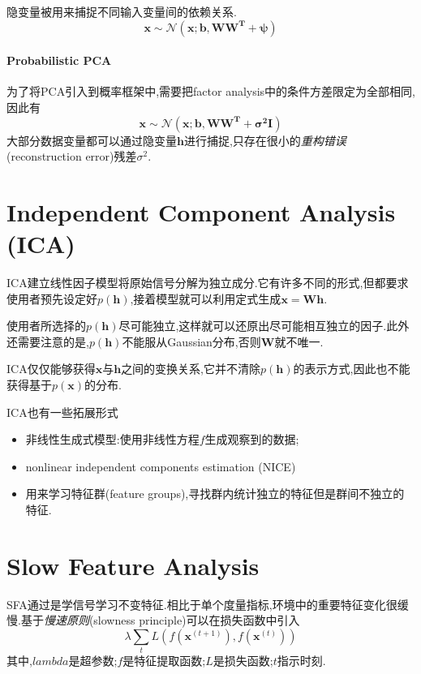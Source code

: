 隐变量被用来捕捉不同输入变量间的依赖关系.
\begin{equation}
\mathbf x\sim\mathcal N(\mathbf{x;b,WW^T+\psi})
\end{equation}

\paragraph{Probabilistic PCA}

为了将PCA引入到概率框架中,需要把factor analysis中的条件方差限定为全部相同,因此有
\begin{equation}
\mathbf x\sim\mathcal N(\mathbf{x;b,WW^T+\sigma^2I})
\end{equation}
大部分数据变量都可以通过隐变量$\mathbf h$进行捕捉,只存在很小的\textit{重构错误}(reconstruction error)残差$\sigma^2$.

\section{Independent Component Analysis (ICA)}

ICA建立线性因子模型将原始信号分解为独立成分.它有许多不同的形式,但都要求使用者预先设定好$p(\mathbf h)$,接着模型就可以利用定式生成$\mathbf{x=Wh}$.

使用者所选择的$p(\mathbf h)$尽可能独立,这样就可以还原出尽可能相互独立的因子.此外还需要注意的是,$p(\mathbf h)$不能服从Gaussian分布,否则$\mathbf W$就不唯一.

ICA仅仅能够获得$\mathbf x$与$\mathbf h$之间的变换关系,它并不清除$p(\mathbf h)$的表示方式,因此也不能获得基于$p(\mathbf x)$的分布.

ICA也有一些拓展形式
\begin{itemize}
    \item 非线性生成式模型:使用非线性方程$f$生成观察到的数据;
    \item nonlinear independent components estimation (NICE)
    \item 用来学习特征群(feature groups),寻找群内统计独立的特征但是群间不独立的特征.
\end{itemize}

\section{Slow Feature Analysis}

SFA通过是学信号学习不变特征.相比于单个度量指标,环境中的重要特征变化很缓慢.基于\textit{慢速原则}(slowness principle)可以在损失函数中引入
\begin{equation}
\lambda\sum_tL(f(\mathbf x^{(t+1)}),f(\mathbf x^{(t)}))
\end{equation}
其中,$lambda$是超参数;$f$是特征提取函数;$L$是损失函数;$t$指示时刻.

